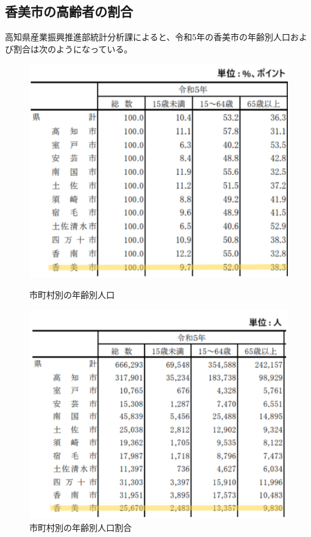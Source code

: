 \subsection{香美市の高齢者の割合}
高知県産業振興推進部統計分析課によると、令和5年の香美市の年齢別人口および割合は次のようになっている。

\begin{figure}[h]
  \centering
  \begin{minipage}{0.43\columnwidth}
    \centering
    \includegraphics[width=\columnwidth]{population_rate.pdf}
    \caption{市町村別の年齢別人口}
    \label{fig:サンプルA}
  \end{minipage}
  \hspace{5mm}
  \begin{minipage}{0.43\columnwidth}
    \centering
    \includegraphics[width=\columnwidth]{population.pdf}
    \caption{市町村別の年齢別人口割合}
    \label{fig:サンプルB}
  \end{minipage}
\end{figure}


